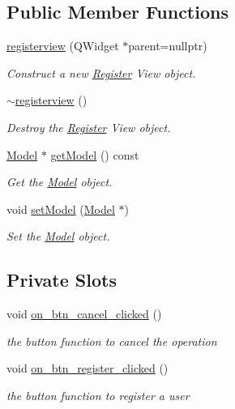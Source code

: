 \subsection*{Public Member Functions}
\begin{DoxyCompactItemize}
\item 
\hyperlink{classregisterview_ad900dd927edcbdf6a134da28df5a83c6}{registerview} (Q\+Widget $\ast$parent=nullptr)
\begin{DoxyCompactList}\small\item\em Construct a new \hyperlink{classRegister}{Register} View object. \end{DoxyCompactList}\item 
\hyperlink{classregisterview_a824fc1c7f2c9a8e62aad92be80d381c6}{$\sim$registerview} ()
\begin{DoxyCompactList}\small\item\em Destroy the \hyperlink{classRegister}{Register} View object. \end{DoxyCompactList}\item 
\hyperlink{classModel}{Model} $\ast$ \hyperlink{classregisterview_a765c4046d743e6f3908615535c16eef1}{get\+Model} () const
\begin{DoxyCompactList}\small\item\em Get the \hyperlink{classModel}{Model} object. \end{DoxyCompactList}\item 
void \hyperlink{classregisterview_ae6d6efee19c05f34f6e1c778f2a76ec7}{set\+Model} (\hyperlink{classModel}{Model} $\ast$)
\begin{DoxyCompactList}\small\item\em Set the \hyperlink{classModel}{Model} object. \end{DoxyCompactList}\end{DoxyCompactItemize}
\subsection*{Private Slots}
\begin{DoxyCompactItemize}
\item 
void \hyperlink{classregisterview_a5541faebc6701e8e2da6a4c107cd4b0e}{on\+\_\+btn\+\_\+cancel\+\_\+clicked} ()
\begin{DoxyCompactList}\small\item\em the button function to cancel the operation \end{DoxyCompactList}\item 
void \hyperlink{classregisterview_adafbe9fb4f180f8badc6dd9788bbcf15}{on\+\_\+btn\+\_\+register\+\_\+clicked} ()
\begin{DoxyCompactList}\small\item\em the button function to register a user \end{DoxyCompactList}\end{DoxyCompactItemize}
